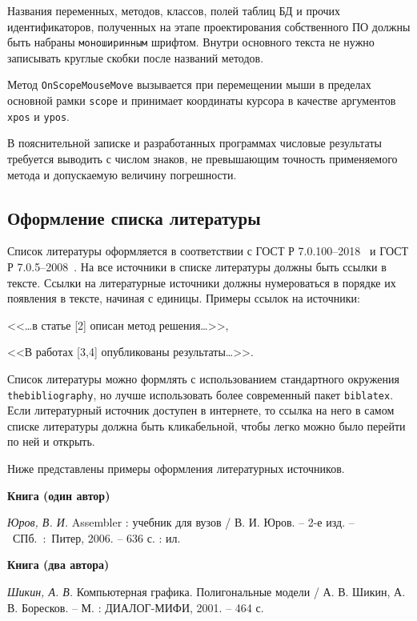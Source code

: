 \documentclass[14pt]{extarticle}
\begin{document}
Названия переменных, методов, классов, полей таблиц БД и прочих идентификаторов, полученных на этапе проектирования собственного ПО должны быть набраны \texttt{моноширинным} шрифтом. Внутри основного текста не нужно записывать круглые скобки после названий методов.

\begin{tcolorbox}[title={Пример использования моноширинного шрифта внутри текста}]
Метод \texttt{OnScopeMouseMove} вызывается при перемещении мыши в пределах основной рамки \verb|scope| и принимает координаты курсора в качестве аргументов \texttt{xpos} и \texttt{ypos}.
\end{tcolorbox}

 В пояснительной записке и разработанных программах числовые результаты требуется выводить с числом знаков, не превышающим точность применяемого метода и допускаемую величину погрешности.

\subsection{Оформление списка литературы}

Список литературы оформляется в соответствии с ГОСТ Р 7.0.100--2018~\cite{gost70100} и ГОСТ Р 7.0.5--2008~\cite{gost705}.
На все источники в списке литературы должны быть ссылки в тексте.
Ссылки на литературные источники должны нумероваться в порядке их появления в тексте, начиная с единицы. Примеры ссылок на источники:
\par <<\dots в статье [2] описан метод решения\dots>>,
\par <<В работах [3,4] опубликованы результаты\dots>>.

Список литературы можно формлять с использованием стандартного окружения \texttt{thebibliography}, но лучше использовать более современный пакет \texttt{biblatex}. Если литературный источник доступен в интернете, то ссылка на него в самом списке литературы должна быть кликабельной, чтобы легко можно было перейти по ней и открыть.

\par Ниже представлены примеры оформления литературных источников.

\textbf{Книга (один автор)}\par
\textit{Юров, В. И.} Assembler : учебник для вузов / В. И. Юров. -- 2-е изд. --~СПб.~:~Питер, 2006. -- 636 с. : ил.

\textbf{Книга (два автора)}\par
\textit{Шикин, А. В.} Компьютерная графика. Полигональные модели / А. В. Шикин, А. В. Боресков. -- М. : ДИАЛОГ-МИФИ, 2001. -- 464 с.
\end{document}
